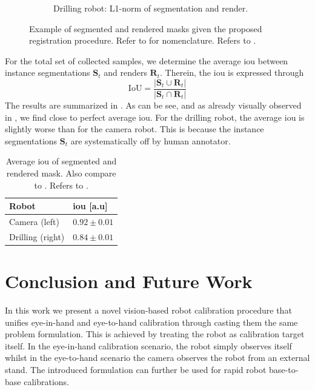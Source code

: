 \begin{figure}[tb]
\begin{subfigure}[b]{0.32\textwidth}
        \caption{Drilling robot: L1-norm of segmentation and render.}
    \end{subfigure}
    \caption{Example of segmented and rendered masks given the proposed registration procedure. Refer to  for nomenclature. Refers to .}
    \label{c1:fig:masks}
\end{figure}

For the total set of collected samples, we determine the average \gls{iou} between instance segmentations $\mathbf{S}_t$ and renders $\mathbf{R}_t$. Therein, the \gls{iou} is expressed through
\begin{equation}
    \text{IoU} = \frac{|\mathbf{S}_t \cup \mathbf{R}_t|}{|\mathbf{S}_t \cap \mathbf{R}_t|}
\end{equation}
The results are summarized in . As can be see, and as already visually observed in , we find close to perfect average \gls{iou}. For the drilling robot, the average \gls{iou} is slightly worse than for the camera robot. This is because the instance segmentations $\mathbf{S}_t$ are systematically off by human annotator.
\begin{table}[tb]
\centering
\caption{Average \gls{iou} of segmented and rendered mask. Also compare to . Refers to .}
\label{c1:tab:iou}
\begin{tabular}{@{}ll@{}}
\toprule
Robot         & \gls{iou} {[}a.u{]}   \\ \midrule
Camera (left)    & $0.92 \pm 0.01$ \\
Drilling (right) & $0.84 \pm 0.01$ \\ \bottomrule
\end{tabular}
\end{table}


\section{Conclusion and Future Work}%
In this work we present a novel vision-based robot calibration procedure that unifies eye-in-hand and eye-to-hand calibration through casting them the same problem formulation. This is achieved by treating the robot as calibration target itself. In the eye-in-hand calibration scenario, the robot simply observes itself whilst in the eye-to-hand scenario the camera observes the robot from an external stand. The introduced formulation can further be used for rapid robot base-to-base calibrations.

